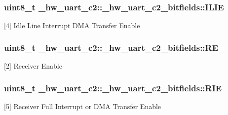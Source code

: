 \subsubsection[{\texorpdfstring{I\+L\+IE}{ILIE}}]{\setlength{\rightskip}{0pt plus 5cm}uint8\+\_\+t \+\_\+hw\+\_\+uart\+\_\+c2\+::\+\_\+hw\+\_\+uart\+\_\+c2\+\_\+bitfields\+::\+I\+L\+IE}\hypertarget{struct__hw__uart__c2_1_1__hw__uart__c2__bitfields_a9df19feee3a9a4cb63a07e833338ea75}{}\label{struct__hw__uart__c2_1_1__hw__uart__c2__bitfields_a9df19feee3a9a4cb63a07e833338ea75}
\mbox{[}4\mbox{]} Idle Line Interrupt D\+MA Transfer Enable 
\subsubsection[{\texorpdfstring{RE}{RE}}]{\setlength{\rightskip}{0pt plus 5cm}uint8\+\_\+t \+\_\+hw\+\_\+uart\+\_\+c2\+::\+\_\+hw\+\_\+uart\+\_\+c2\+\_\+bitfields\+::\+RE}\hypertarget{struct__hw__uart__c2_1_1__hw__uart__c2__bitfields_a8c09632eb3f294b7e4a13aaa8dbc7ef6}{}\label{struct__hw__uart__c2_1_1__hw__uart__c2__bitfields_a8c09632eb3f294b7e4a13aaa8dbc7ef6}
\mbox{[}2\mbox{]} Receiver Enable 
\subsubsection[{\texorpdfstring{R\+IE}{RIE}}]{\setlength{\rightskip}{0pt plus 5cm}uint8\+\_\+t \+\_\+hw\+\_\+uart\+\_\+c2\+::\+\_\+hw\+\_\+uart\+\_\+c2\+\_\+bitfields\+::\+R\+IE}\hypertarget{struct__hw__uart__c2_1_1__hw__uart__c2__bitfields_a1b99839e200d445e83533766f9215d52}{}\label{struct__hw__uart__c2_1_1__hw__uart__c2__bitfields_a1b99839e200d445e83533766f9215d52}
\mbox{[}5\mbox{]} Receiver Full Interrupt or D\+MA Transfer Enable 
